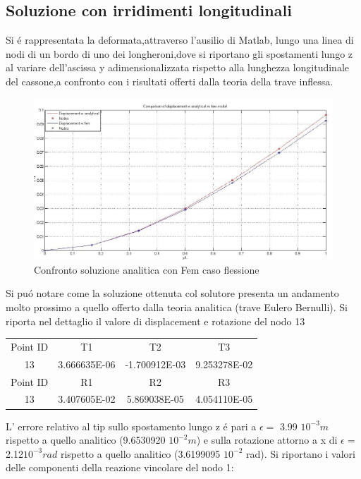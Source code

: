 \documentclass[12pt,a4paper]{article}
\begin{document}
\subsection{Soluzione con irridimenti longitudinali}
Si \'e rappresentata la deformata,attraverso l'ausilio di Matlab, lungo una linea di nodi di un bordo di uno dei
longheroni,dove si riportano gli spostamenti lungo z al variare dell'ascissa y adimensionalizzata rispetto alla
lunghezza longitudinale del cassone,a confronto con i risultati offerti dalla teoria della trave inflessa.
\begin{figure}[htbp]
\centering
\includegraphics[width=150mm]{Immagini/Confrontoanalitico}
\caption{Confronto soluzione analitica con Fem caso flessione}
\end{figure}
\newpage
Si pu\'o notare come la soluzione ottenuta col solutore presenta un andamento molto prossimo a
quello offerto dalla teoria analitica (trave Eulero Bernulli).
Si riporta nel dettaglio il valore di displacement e rotazione del nodo 13
\begin{center}
\begin{tabular}{c c c c}
\hline
Point ID & T1 & T2  &  T3\\
13 & 3.666635E-06 & -1.700912E-03 & 9.253278E-02\\
\hline
Point ID & R1  &  R2  &  R3\\
13 & 3.407605E-02 & 5.869038E-05 & 4.054110E-05\\
\hline
\end{tabular}
\end{center}
L' errore relativo al tip sullo spostamento lungo z \'e pari a $ \epsilon =$ 3.99 $10^{-3} m$  rispetto a quello analitico (9.6530920 $10^{-2} m$) e sulla rotazione attorno a x di $\epsilon =$2.12$10^{-3} rad$ rispetto a quello analitico (3.6199095  $10^{-2}$ rad).
Si riportano i valori delle componenti della reazione vincolare del nodo 1:
\end{document}

